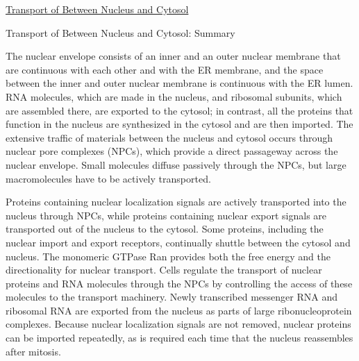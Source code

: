 \documentclass[12pt,letterpaper]{article}
\begin{document}
\begin{secbox}{\hyperlink{12}{Transport of Between Nucleus and Cytosol}}
{    \hypertarget{12.2.r}{}
    \begin{probbox}{Transport of Between Nucleus and Cytosol: Summary}\end{probbox}

    The nuclear envelope consists of an inner and an outer nuclear membrane that are continuous with each other and with the ER membrane, and the space between the inner and outer nuclear membrane is continuous with the ER lumen. RNA molecules, which are made in the nucleus, and ribosomal subunits, which are assembled there, are exported to the cytosol; in contrast, all the proteins that function in the nucleus are synthesized in the cytosol and are then imported. The extensive traffic of materials between the nucleus and cytosol occurs through nuclear pore complexes (NPCs), which provide a direct passageway across the nuclear envelope. Small molecules diffuse passively through the NPCs, but large macromolecules have to be actively transported. \par 
    \vspace{12pt}
    Proteins containing nuclear localization signals are actively transported into the nucleus through NPCs, while proteins containing nuclear export signals are transported out of the nucleus to the cytosol. Some proteins, including the nuclear import and export receptors, continually shuttle between the cytosol and nucleus. The monomeric GTPase Ran provides both the free energy and the directionality for nuclear transport. Cells regulate the transport of nuclear proteins and RNA molecules through the NPCs by controlling the access of these molecules to the transport machinery. Newly transcribed messenger RNA and ribosomal RNA are exported from the nucleus as parts of large ribonucleoprotein complexes. Because nuclear localization signals are not removed, nuclear proteins can be imported repeatedly, as is required each time that the nucleus reassembles after mitosis.
}\end{secbox}
\end{document}
